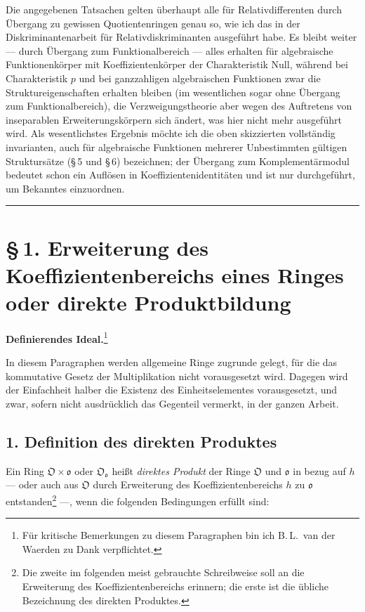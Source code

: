 \documentclass[10pt,a4paper]{article}
\theoremstyle{plain}
\theoremstyle{definition}
\theoremstyle{remark}
\newcommand{\ido}{\mathfrak{o}}
\newcommand{\cO}{\mathfrak{O}}
\begin{document}
Die angegebenen Tatsachen gelten \"uberhaupt alle f\"ur Relativdifferenten durch \"Ubergang zu gewissen Quotientenringen genau so, wie ich das in der Diskriminantenarbeit f\"ur Relativdiskriminanten ausgef\"uhrt habe. Es bleibt weiter --- durch \"Ubergang zum Funktionalbereich --- alles erhalten f\"ur algebraische Funktionenk\"orper mit Koeffizientenk\"orper der Charakteristik Null, w\"ahrend bei Charakteristik $p$ und bei ganzzahligen algebraischen Funktionen zwar die Struktureigenschaften erhalten bleiben (im wesentlichen sogar ohne \"Ubergang zum Funktionalbereich), die Verzweigungstheorie aber wegen des Auftretens von inseparablen Erweiterungsk\"orpern sich \"andert, was hier nicht mehr ausgef\"uhrt wird. Als wesentlichstes Ergebnis m\"ochte ich die oben skizzierten vollst\"andig invarianten, auch f\"ur algebraische Funktionen mehrerer Unbestimmten g\"ultigen Strukturs\"atze (\S\,5 und \S\,6) bezeichnen; der \"Ubergang zum Komplement\"armodul bedeutet schon ein Aufl\"osen in Koeffizientenidentit\"aten und ist nur durchgef\"uhrt, um Bekanntes einzuordnen.

\bigskip
\noindent\rule{\textwidth}{0.4pt}

\section*{\S\,1. Erweiterung des Koeffizientenbereichs eines Ringes oder direkte Produktbildung}

\textbf{Definierendes Ideal.}\footnote{F\"ur kritische Bemerkungen zu diesem Paragraphen bin ich B.\,L.\ van der Waerden zu Dank verpflichtet.}

In diesem Paragraphen werden allgemeine Ringe zugrunde gelegt, f\"ur die das kommutative Gesetz der Multiplikation nicht vorausgesetzt wird. Dagegen wird der Einfachheit halber die Existenz des Einheitselementes vorausgesetzt, und zwar, sofern nicht ausdr\"ucklich das Gegenteil vermerkt, in der ganzen Arbeit.

\subsection*{1. Definition des direkten Produktes}

Ein Ring $\cO \times \ido$ oder $\cO_{\ido}$ hei\ss t \emph{direktes Produkt} der Ringe $\cO$ und $\ido$ in bezug auf $h$ --- oder auch aus $\cO$ durch Erweiterung des Koeffizientenbereichs $h$ zu $\ido$ entstanden\footnote{Die zweite im folgenden meist gebrauchte Schreibweise soll an die Erweiterung des Koeffizientenbereichs erinnern; die erste ist die \"ubliche Bezeichnung des direkten Produktes.} ---, wenn die folgenden Bedingungen erf\"ullt sind:
\end{document}
